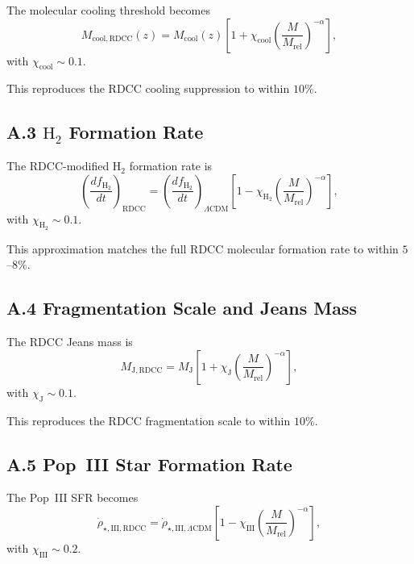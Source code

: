 \documentclass[11pt,a4paper]{article}
\begin{document}
The molecular cooling threshold becomes
\begin{equation}
    M_{\mathrm{cool,RDCC}}(z)
    = M_{\mathrm{cool}}(z)
      \left[
        1 + \chi_{\mathrm{cool}}
        \left(\frac{M}{M_{\mathrm{rel}}}\right)^{-\alpha}
      \right],
\end{equation}
with $\chi_{\mathrm{cool}} \sim 0.1$.

This reproduces the RDCC cooling suppression to within $10\%$.

\subsection*{A.3 $\mathrm{H}_2$ Formation Rate}

The RDCC-modified $\mathrm{H}_2$ formation rate is
\begin{equation}
    \left(\frac{df_{\mathrm{H_2}}}{dt}\right)_{\mathrm{RDCC}}
    = \left(\frac{df_{\mathrm{H_2}}}{dt}\right)_{\Lambda\mathrm{CDM}}
      \left[
        1 - \chi_{\mathrm{H_2}}
        \left(\frac{M}{M_{\mathrm{rel}}}\right)^{-\alpha}
      \right],
\end{equation}
with $\chi_{\mathrm{H_2}} \sim 0.1$.

This approximation matches the full RDCC molecular formation rate to within $5$–$8\%$.

\subsection*{A.4 Fragmentation Scale and Jeans Mass}

The RDCC Jeans mass is
\begin{equation}
    M_{\mathrm{J,RDCC}}
    = M_{\mathrm{J}}
      \left[
        1 + \chi_{\mathrm{J}}
        \left(\frac{M}{M_{\mathrm{rel}}}\right)^{-\alpha}
      \right],
\end{equation}
with $\chi_{\mathrm{J}} \sim 0.1$.

This reproduces the RDCC fragmentation scale to within $10\%$.

\subsection*{A.5 Pop~III Star Formation Rate}

The Pop~III SFR becomes
\begin{equation}
    \dot{\rho}_{\star,\mathrm{III,RDCC}}
    = \dot{\rho}_{\star,\mathrm{III},\Lambda\mathrm{CDM}}
      \left[
        1 - \chi_{\mathrm{III}}
        \left(\frac{M}{M_{\mathrm{rel}}}\right)^{-\alpha}
      \right],
\end{equation}
with $\chi_{\mathrm{III}} \sim 0.2$.
\end{document}
